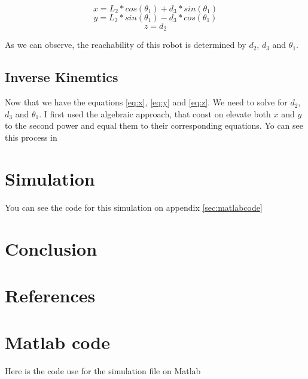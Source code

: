 \documentclass[12pt]{article}
\begin{document}
    \begin{equation}
	    x = L_2 * cos(\theta_1) + d_3 * sin(\theta_1)
        \label{eq:x}
    \end{equation}
    \begin{equation}
        y = L_2 * sin(\theta_1) - d_3 * cos(\theta_1) 
        \label{eq:y}
    \end{equation}
    \begin{equation}
        z = d_2
        \label{eq:z}
    \end{equation} 

        As  we can observe, the reachability of this robot is determined by $d_2$, $d_3$ and $\theta_1$.
        \subsection{Inverse Kinemtics}
        Now that we have the equations \ref*{eq:x}, \ref*{eq:y} and \ref*{eq:z}. We need to solve for $d_2$, $d_3$ and $\theta_1$.
        I first used the algebraic approach, that const on elevate both $x$ and $y$ to the second power and equal them to their corresponding equations.
        Yo can see this process in 


    \section{Simulation}
    You can see the code for this simulation on appendix \ref{sec:matlabcode}
    \section{Conclusion}

    \pagebreak
    \section*{References}
    \printbibliography

    \pagebreak
    \appendix
    \section{Matlab code}
    Here is the code use for the simulation file on Matlab


    \label{sec:matlabcode}
\end{document}
